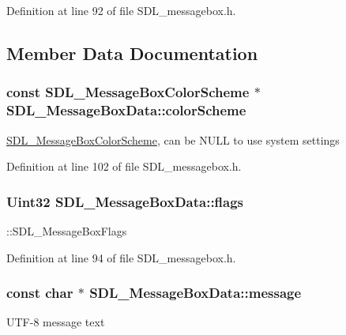 Definition at line 92 of file S\+D\+L\+\_\+messagebox.\+h.



\subsection{Member Data Documentation}
\hypertarget{structSDL__MessageBoxData_af6345341d6c7271c3322dd05cb2c4fd4}{
\subsubsection[{color\+Scheme}]{\setlength{\rightskip}{0pt plus 5cm}const {\bf S\+D\+L\+\_\+\+Message\+Box\+Color\+Scheme} $\ast$ S\+D\+L\+\_\+\+Message\+Box\+Data\+::color\+Scheme}}\label{structSDL__MessageBoxData_af6345341d6c7271c3322dd05cb2c4fd4}
\hyperlink{structSDL__MessageBoxColorScheme}{S\+D\+L\+\_\+\+Message\+Box\+Color\+Scheme}, can be N\+U\+L\+L to use system settings 

Definition at line 102 of file S\+D\+L\+\_\+messagebox.\+h.

\hypertarget{structSDL__MessageBoxData_a113d016f760bf4e4156b0f376358d6a0}{
\subsubsection[{flags}]{\setlength{\rightskip}{0pt plus 5cm}Uint32 S\+D\+L\+\_\+\+Message\+Box\+Data\+::flags}}\label{structSDL__MessageBoxData_a113d016f760bf4e4156b0f376358d6a0}
\+::\+S\+D\+L\+\_\+\+Message\+Box\+Flags 

Definition at line 94 of file S\+D\+L\+\_\+messagebox.\+h.

\hypertarget{structSDL__MessageBoxData_acbdbaaa13703e12193a0cd0b8373f8a4}{
\subsubsection[{message}]{\setlength{\rightskip}{0pt plus 5cm}const char $\ast$ S\+D\+L\+\_\+\+Message\+Box\+Data\+::message}}\label{structSDL__MessageBoxData_acbdbaaa13703e12193a0cd0b8373f8a4}
U\+T\+F-\/8 message text 

